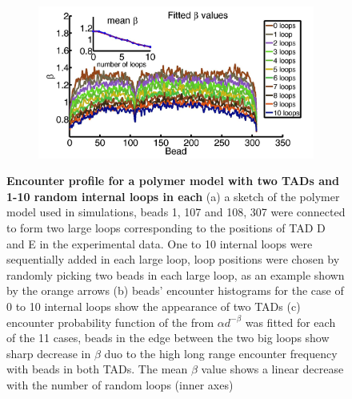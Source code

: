 \documentclass[12pt]{article}
\begin{document}
\begin{figure}[H]
\begin{subfigure}[b]{0.12\textwidth}
\includegraphics[scale=0.2]{fittedExpTwoFixedLoop1To10RandomLoops307Beads}
\caption{}
\end{subfigure}
\caption{\textbf{Encounter profile for a polymer model with two TADs and 1-10 random internal loops in each} (a) a sketch of the polymer model used in simulations, beads 1, 107 and 108, 307 were connected to form two large loops corresponding to the positions of TAD D and E in the experimental data. One to 10 internal loops were sequentially added in each large loop, loop positions were chosen by randomly picking two beads in each large loop, as an example shown by the orange arrows (b) beads' encounter histograms for the case of 0 to 10 internal loops show the appearance of two TADs (c) encounter probability function of the from $\alpha d^{-\beta}$ was fitted for each of the 11 cases, beads in the edge between the two big loops show sharp decrease in $\beta$ duo to the high long range encounter frequency with beads in both TADs. The mean $\beta$ value shows a linear decrease with the number of random loops (inner axes)}
\label{figure_encounterProfileTwoTADs}

\end{figure}



\end{document}
